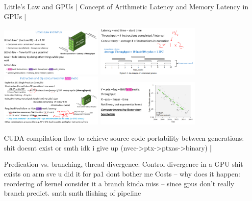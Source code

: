 \documentclass[letter,8pt,landscape]{article}
\begin{document}
\begin{multicols}{3}
  Little’s Law and GPUs |
  Concept of Arithmetic Latency and Memory Latency in GPUs |
  \begin{center}
    \includegraphics[width=2in]{images/gpu-little.jpg}
    \includegraphics[width=2in]{images/gpu-ilp-little.jpg}
    \includegraphics[width=2in]{images/gpu-ilp-eg.jpg}
    \includegraphics[width=2in]{images/mem-wall.jpg}
  \end{center}

  CUDA compilation flow to achieve source code portability between generations:
  shit doesnt exist or smth idk i give up
  (nvcc->ptx->ptxas->binary) |

  Predication vs. branching, thread divergence: Control divergence in a GPU
  shit exists on arm sve u did it for pa1 dont bother me
  Costs – why does it happen: reordering of kernel consider it a branch kinda
  miss -- since gpus don't really branch predict. smth smth flishing of pipeline


\end{multicols}
\end{document}
